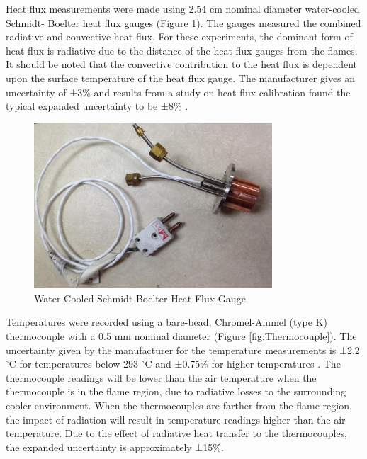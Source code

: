 \documentclass{article}
\begin{document}
Heat flux measurements were made using 2.54 cm nominal diameter water-cooled Schmidt- Boelter heat flux gauges (Figure \ref{fig:HeatFluxGauge}). The gauges measured the combined radiative and convective heat flux. For these experiments, the dominant form of heat flux is radiative due to the distance of the heat flux gauges from the flames. It should be noted that the convective contribution to the heat flux is dependent upon the surface temperature of the heat flux gauge. The manufacturer gives an uncertainty of ±3\% and results from a study on heat flux calibration found the typical expanded uncertainty to be ±8\% \cite{HeatFluxRoundRobin}.

\begin{figure} [H]
	\centering
	\includegraphics[width = 3.5in]{0_Images/Instrumentation/Heat_Flux_Gauge.jpg}
	\caption{Water Cooled Schmidt-Boelter Heat Flux Gauge}
	\label{fig:HeatFluxGauge}
\end{figure}

Temperatures were recorded using a bare-bead, Chromel-Alumel (type K) thermocouple with a 0.5 mm nominal diameter (Figure \ref{fig:Thermocouple}). The uncertainty given by the manufacturer for the temperature measurements is ±2.2 $^{\circ}$C for temperatures below 293 $^{\circ}$C and ±0.75\% for higher temperatures \cite{TemperatureHandbook}. The thermocouple readings will be lower than the air temperature when the thermocouple is in the flame region, due to radiative losses to the surrounding cooler environment. When the thermocouples are farther from the flame region, the impact of radiation will result in temperature readings higher than the air temperature. Due to the effect of radiative heat transfer to the thermocouples, the expanded uncertainty is approximately ±15\%.
\end{document}
